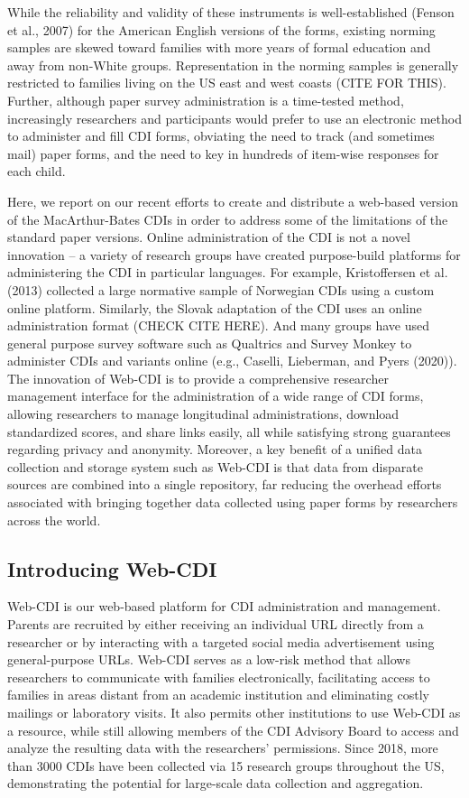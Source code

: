 \documentclass[
  english,
  man]{apa7}
\begin{document}
While the reliability and validity of these instruments is well-established (Fenson et al., 2007) for the American English versions of the forms, existing norming samples are skewed toward families with more years of formal education and away from non-White groups. Representation in the norming samples is generally restricted to families living on the US east and west coasts (CITE FOR THIS). Further, although paper survey administration is a time-tested method, increasingly researchers and participants would prefer to use an electronic method to administer and fill CDI forms, obviating the need to track (and sometimes mail) paper forms, and the need to key in hundreds of item-wise responses for each child.

Here, we report on our recent efforts to create and distribute a web-based version of the MacArthur-Bates CDIs in order to address some of the limitations of the standard paper versions. Online administration of the CDI is not a novel innovation -- a variety of research groups have created purpose-build platforms for administering the CDI in particular languages. For example, Kristoffersen et al. (2013) collected a large normative sample of Norwegian CDIs using a custom online platform. Similarly, the Slovak adaptation of the CDI uses an online administration format (CHECK CITE HERE). And many groups have used general purpose survey software such as Qualtrics and Survey Monkey to administer CDIs and variants online (e.g., Caselli, Lieberman, and Pyers (2020)). The innovation of Web-CDI is to provide a comprehensive researcher management interface for the administration of a wide range of CDI forms, allowing researchers to manage longitudinal administrations, download standardized scores, and share links easily, all while satisfying strong guarantees regarding privacy and anonymity. Moreover, a key benefit of a unified data collection and storage system such as Web-CDI is that data from disparate sources are combined into a single repository, far reducing the overhead efforts associated with bringing together data collected using paper forms by researchers across the world.

\hypertarget{introducing-web-cdi}{%
\subsection{Introducing Web-CDI}\label{introducing-web-cdi}}

Web-CDI is our web-based platform for CDI administration and management. Parents are recruited by either receiving an individual URL directly from a researcher or by interacting with a targeted social media advertisement using general-purpose URLs. Web-CDI serves as a low-risk method that allows researchers to communicate with families electronically, facilitating access to families in areas distant from an academic institution and eliminating costly mailings or laboratory visits. It also permits other institutions to use Web-CDI as a resource, while still allowing members of the CDI Advisory Board to access and analyze the resulting data with the researchers' permissions. Since 2018, more than 3000 CDIs have been collected via 15 research groups throughout the US, demonstrating the potential for large-scale data collection and aggregation.
\end{document}

